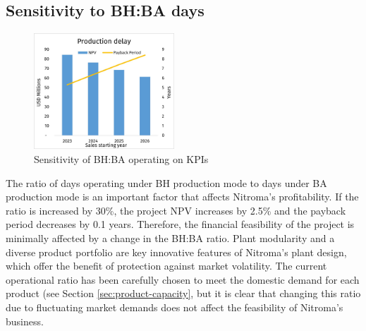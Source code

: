 \subsection{Sensitivity to BH:BA days}
\begin{figure}
    \caption{Sensitivity of BH:BA operating on KPIs}
    \label{Sensitivity_ProductionDelay}
    \includegraphics[width=0.47\textwidth]{chapters/6-economics/figures/Sensitivity_ProductionDelay.jpg}
\end{figure}
The ratio of days operating under BH production mode to days under BA production mode is an important factor that affects Nitroma’s profitability. If the ratio is increased by 30\%, the project NPV increases by 2.5\% and the payback period decreases by 0.1 years. Therefore, the financial feasibility of the project is minimally affected by a change in the BH:BA ratio. Plant modularity and a diverse product portfolio are key innovative features of Nitroma’s plant design, which offer the benefit of protection against market volatility. The current operational ratio has been carefully chosen to meet the domestic demand for each product (see Section \ref{sec:product-capacity}, but it is clear that changing this ratio due to fluctuating market demands does not affect the feasibility of Nitroma’s business.